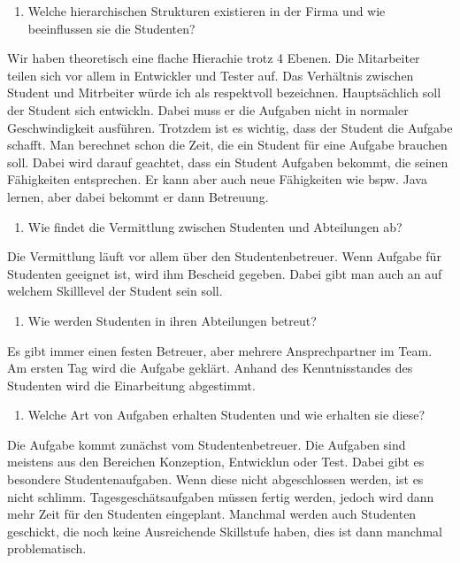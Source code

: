 \documentclass[
  12pt,
  ngerman,
  a4paper,
]{article}
\providecommand{\tightlist}{%
  \setlength{\itemsep}{0pt}\setlength{\parskip}{0pt}}
\begin{document}
\begin{enumerate}
\def\labelenumi{\arabic{enumi}.}
\setcounter{enumi}{3}
\tightlist
\item
  Welche hierarchischen Strukturen existieren in der Firma und wie
  beeinflussen sie die Studenten?
\end{enumerate}

Wir haben theoretisch eine flache Hierachie trotz 4 Ebenen. Die
Mitarbeiter teilen sich vor allem in Entwickler und Tester auf. Das
Verhältnis zwischen Student und Mitrbeiter würde ich als respektvoll
bezeichnen. Hauptsächlich soll der Student sich entwickln. Dabei muss er
die Aufgaben nicht in normaler Geschwindigkeit ausführen. Trotzdem ist
es wichtig, dass der Student die Aufgabe schafft. Man berechnet schon
die Zeit, die ein Student für eine Aufgabe brauchen soll. Dabei wird
darauf geachtet, dass ein Student Aufgaben bekommt, die seinen
Fähigkeiten entsprechen. Er kann aber auch neue Fähigkeiten wie bspw.
Java lernen, aber dabei bekommt er dann Betreuung.

\begin{enumerate}
\def\labelenumi{\arabic{enumi}.}
\setcounter{enumi}{4}
\tightlist
\item
  Wie findet die Vermittlung zwischen Studenten und Abteilungen ab?
\end{enumerate}

Die Vermittlung läuft vor allem über den Studentenbetreuer. Wenn Aufgabe
für Studenten geeignet ist, wird ihm Bescheid gegeben. Dabei gibt man
auch an auf welchem Skilllevel der Student sein soll.

\begin{enumerate}
\def\labelenumi{\arabic{enumi}.}
\setcounter{enumi}{5}
\tightlist
\item
  Wie werden Studenten in ihren Abteilungen betreut?
\end{enumerate}

Es gibt immer einen festen Betreuer, aber mehrere Ansprechpartner im
Team. Am ersten Tag wird die Aufgabe geklärt. Anhand des Kenntnisstandes
des Studenten wird die Einarbeitung abgestimmt.

\begin{enumerate}
\def\labelenumi{\arabic{enumi}.}
\setcounter{enumi}{6}
\tightlist
\item
  Welche Art von Aufgaben erhalten Studenten und wie erhalten sie diese?
\end{enumerate}

Die Aufgabe kommt zunächst vom Studentenbetreuer. Die Aufgaben sind
meistens aus den Bereichen Konzeption, Entwicklun oder Test. Dabei gibt
es besondere Studentenaufgaben. Wenn diese nicht abgeschlossen werden,
ist es nicht schlimm. Tagesgeschätsaufgaben müssen fertig werden, jedoch
wird dann mehr Zeit für den Studenten eingeplant. Manchmal werden auch
Studenten geschickt, die noch keine Ausreichende Skillstufe haben, dies
ist dann manchmal problematisch.
\end{document}
